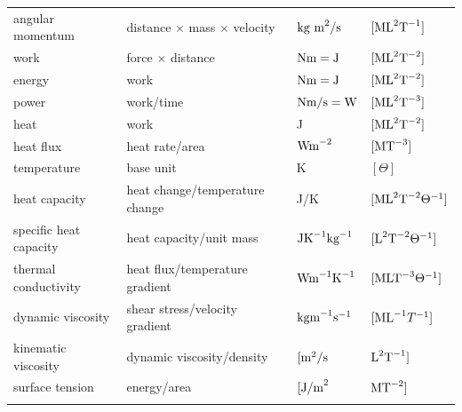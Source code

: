 \documentclass[graybox,envcountchap,sectrefs,final]{svmonodo}
\begin{document}
{\begin{tabular}{llll}
angular momentum                     & distance $\times$ mass $\times$ velocity & $\hbox{kg m}^2/\hbox{s}$       & $[\hbox{ML}^2\hbox{T}^{-1}]$            \\
work                                 & force $\times$ distance                  & $\hbox{Nm} = \hbox{J}$         & $[\hbox{ML}^2\hbox{T}^{-2}]$            \\
energy                               & work                                     & $\hbox{Nm} = \hbox{J}$         & $[\hbox{ML}^2\hbox{T}^{-2}]$            \\
power                                & work/time                                & $\hbox{Nm/s} = \hbox{W}$       & $[\hbox{ML}^2\hbox{T}^{-3}]$            \\
heat                                 & work                                     & J                              & $[\hbox{ML}^2\hbox{T}^{-2}]$            \\
heat flux                            & heat rate/area                           & $\hbox{Wm}^{-2}$               & $[\hbox{MT}^{-3}]$                      \\
temperature                          & base unit                                & K                              & $[\Theta]$                              \\
heat capacity                        & heat change/temperature change           & J/K                            & $[\hbox{ML}^2\hbox{T}^{-2}\Theta^{-1}]$ \\
specific heat capacity               & heat capacity/unit mass                  & $\hbox{JK}^{-1}\hbox{kg}^{-1}$ & $[\hbox{L}^2\hbox{T}^{-2}\Theta^{-1}]$  \\
thermal conductivity                 & heat flux/temperature gradient           & $\hbox{Wm}^{-1}\hbox{K}^{-1}$  & $[\hbox{MLT}^{-3}\Theta^{-1}]$          \\
dynamic viscosity                    & shear stress/velocity gradient           & $\hbox{kgm}^{-1}\hbox{s}^{-1}$ & $[\hbox{ML}^{-1}T^{-1}]$                \\
kinematic viscosity                  & dynamic viscosity/density                & $[\hbox{m}^2/\hbox{s}$         & $\hbox{L}^2\hbox{T}^{-1}]$              \\
surface tension                      & energy/area                              & $[\hbox{J/m}^2$                & $\hbox{MT}^{-2}]$                       \\
\noalign{\smallskip}\hline\noalign{\smallskip}
\end{tabular}

\vspace{4mm}

}
\end{document}

